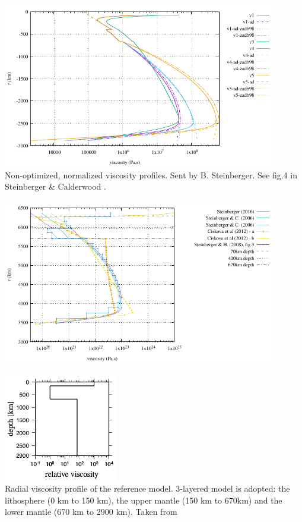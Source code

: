 
\begin{center}
\includegraphics[width=12cm]{images/viscosity_profile/profiles_steinberger}\\
{\captionfont 
Non-optimized, normalized viscosity profiles. Sent by B. Steinberger. 
See fig.4 in Steinberger \& Calderwood \cite{stca06}.}
\end{center}


\begin{center}
\includegraphics[width=12cm]{images/viscosity_profile/profiles}
\end{center}



\begin{center}
\includegraphics[width=5cm]{images/viscosity_profile/yohk01}\\
{\captionfont Radial viscosity profile of the reference model. 3-layered model is adopted: 
the lithosphere (0 km to 150 km), the upper mantle (150 km to 670km) 
and the lower mantle (670 km to 2900 km). Taken from \cite{yohk01}}
\end{center}

